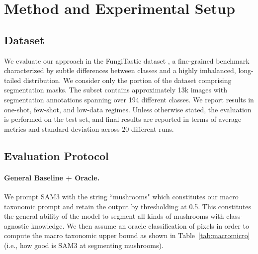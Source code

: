 \section{Method and Experimental Setup}
\label{sec:setup}


\subsection{Dataset}
We evaluate our approach in the FungiTastic dataset \cite{Picek_2025_CVPR}, a fine-grained benchmark characterized by subtle differences between classes and a highly imbalanced, long-tailed distribution. We consider only the portion of the dataset comprising segmentation masks. The subset contains approximately 13k images with segmentation annotations spanning over 194 different classes. 
We report results in one-shot, few-shot, and low-data regimes. Unless otherwise stated, the evaluation is performed on the test set, and final results are reported in terms of average metrics and standard deviation across $20$ different runs.

\subsection{Evaluation Protocol}

\paragraph{General Baseline + Oracle.} We prompt SAM3 with the string ``mushrooms" which constitutes our macro taxonomic prompt and retain the output by thresholding at 0.5. This constitutes the general ability of the model to segment all kinds of mushrooms with class-agnostic knowledge. We then assume an oracle classification of pixels in order to compute the macro taxonomic upper bound as shown in Table~\ref{tab:macromicro} (i.e., how good is SAM3 at segmenting mushrooms).

